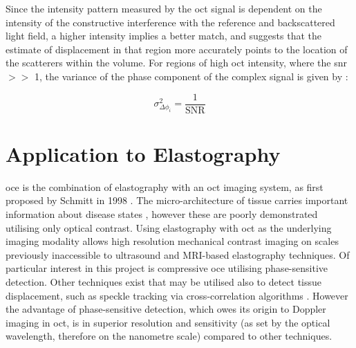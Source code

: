 Since the intensity pattern measured by the \ac{oct} signal is dependent on the intensity of the constructive interference with the reference and backscattered light field, a higher intensity implies a better match, and suggests that the estimate of displacement in that region more accurately points to the location of the scatterers within the volume. For regions of high \ac{oct} intensity, where the \ac{snr} $>>$ 1, the variance of the phase component of the complex signal is given by \cite{goodman_statistical_2015}:

\begin{equation}
	\sigma^2_{\Delta\phi_i} = \frac{1}{\text{SNR}}
	\label{snr_variance}
\end{equation}

\section{Application to Elastography}\label{application_elastography}

\ac{oce} is the combination of elastography with an \ac{oct} imaging system, as first proposed by Schmitt in 1998 \cite{schmitt_oct_1998}. The micro-architecture of tissue carries important information about disease states \cite{fung_biomechanics_1981}, however these are poorly demonstrated utilising only optical contrast. Using elastography with \ac{oct} as the underlying imaging modality allows high resolution mechanical contrast imaging on scales previously inaccessible to ultrasound and MRI-based elastography techniques. Of particular interest in this project is compressive \ac{oce} utilising phase-sensitive detection. Other techniques exist that may be utilised also to detect tissue displacement, such as speckle tracking via cross-correlation algorithms \cite{kennedy_review_2014}. However the advantage of phase-sensitive detection, which owes its origin to Doppler imaging in \ac{oct}, is in superior resolution and sensitivity (as set by the optical wavelength, therefore on the nanometre scale) compared to other techniques. 

